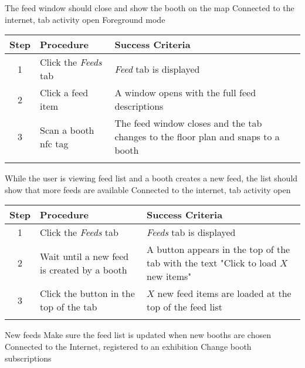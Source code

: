 \testcase
{\casethree}
{The feed window should close and show the booth on the map}
{Connected to the internet, tab activity open}
{Foreground mode}

\begin{center}
\begin{tabular}{| c | p{4.6cm} | p{4.6cm} |}
\hline
\textbf{Step} & \textbf{Procedure} & \textbf{Success Criteria}\\
\hline
1 & Click the \textit{Feeds} tab & \textit{Feed} tab is displayed\\
\hline
2 & Click a feed item & A window opens with the full feed descriptions\\
\hline
3 & Scan a booth \ac{nfc} tag & The feed window closes and the tab changes to the floor plan and snaps to a booth\\
\hline
\multicolumn{3}{c}{} \\%
\end{tabular}
\end{center}

\testcase
{\casefour}
{While the user is viewing feed list and a booth creates a new feed, the list should show that more feeds are available}
{Connected to the internet, tab activity open}
{}

\begin{center}
\begin{tabular}{| c | p{4.6cm} | p{4.6cm} |}
\hline
\textbf{Step} & \textbf{Procedure} & \textbf{Success Criteria}\\
\hline
1 & Click the \textit{Feeds} tab & \textit{Feeds} tab is displayed\\
\hline
2 & Wait until a new feed is created by a booth & A button appears in the top of the tab with the text "Click to load $X$ new items"\\
\hline
3 & Click the button in the top of the tab & $X$ new feed items are loaded at the top of the feed list\\
\hline
\multicolumn{3}{c}{} \\%
\end{tabular}
\end{center}

\newcommand{\casefive}{New feeds}
\newcommand{\casesix}{Register a user}
\newcommand{\caseseven}{Snap to booth}
\newcommand{\caseeight}{Navigate to booth}
\newcommand{\casenine}{Register new exhibition}

\testcase
{\casefive}
{Make sure the feed list is updated when new booths are chosen}
{Connected to the Internet, registered to an exhibition}
{Change booth subscriptions}

